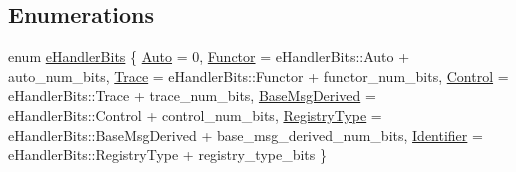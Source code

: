 \subsection*{Enumerations}
\begin{DoxyCompactItemize}
\item 
enum \hyperlink{namespacevt_af182285b57b225b163d5d8aff03cb8c2}{e\+Handler\+Bits} \{ \newline
\hyperlink{namespacevt_af182285b57b225b163d5d8aff03cb8c2abfa992da505171200949c7e580e84ea2}{Auto} = 0, 
\hyperlink{namespacevt_af182285b57b225b163d5d8aff03cb8c2ac61e9f48e514369f0eb8ac5cebf9fb14}{Functor} = e\+Handler\+Bits\+:\+:Auto + auto\+\_\+num\+\_\+bits, 
\hyperlink{namespacevt_af182285b57b225b163d5d8aff03cb8c2aee391b103987f3eb488e081ecc1fc5e8}{Trace} = e\+Handler\+Bits\+:\+:Functor + functor\+\_\+num\+\_\+bits, 
\hyperlink{namespacevt_af182285b57b225b163d5d8aff03cb8c2a3e3fe7a58187c2288f3c2177be08d4d5}{Control} = e\+Handler\+Bits\+:\+:Trace + trace\+\_\+num\+\_\+bits, 
\newline
\hyperlink{namespacevt_af182285b57b225b163d5d8aff03cb8c2acff3b95c0c9083c01b66480d93ef1209}{Base\+Msg\+Derived} = e\+Handler\+Bits\+:\+:Control + control\+\_\+num\+\_\+bits, 
\hyperlink{namespacevt_af182285b57b225b163d5d8aff03cb8c2a38b6a6e4bb9065af38719600c607754a}{Registry\+Type} = e\+Handler\+Bits\+:\+:Base\+Msg\+Derived + base\+\_\+msg\+\_\+derived\+\_\+num\+\_\+bits, 
\hyperlink{namespacevt_af182285b57b225b163d5d8aff03cb8c2a4f58efa47c6cfd117a011be7820d1d8a}{Identifier} = e\+Handler\+Bits\+:\+:Registry\+Type + registry\+\_\+type\+\_\+bits
 \}
\end{DoxyCompactItemize}
